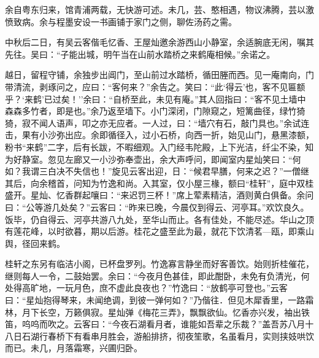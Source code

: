 \documentclass[]{article}
\begin{document}
余自粤东归来，馆青浦两载，无快游可述。未几，芸、憨相遇，物议沸腾，芸以激愤致病。余与程墨安设一书画铺于家门之侧，聊佐汤药之需。

中秋后二日，有吴云客偕毛忆香、王屋灿邀余游西山小静室，余适腕底无闲，嘱其先往。吴曰：``子能出城，明午当在山前水踏桥之来鹤庵相候。''余诺之。

越日，留程守铺，余独步出阊门，至山前过水踏桥，循田塍而西。见一庵南向，门带清流，剥琢问之，应曰：``客何来？''余告之。笑曰：``此`得云'也，客不见匾额乎？`来鹤'已过矣！''余曰：``自桥至此，未见有庵。''其人回指曰：``客不见土墙中森森多竹者，即是也。''余乃返至墙下。小门深闭，门隙窥之，短篱曲径，绿竹猗猗，寂不闻人语声，叩之亦无应者。一人过，曰：``墙穴有石，敲门具也。''余试连击，果有小沙弥出应。余即循径入，过小石桥，向西一折，始见山门，悬黑漆额，粉书``来鹤''二字，后有长跋，不暇细观。入门经韦陀殿，上下光洁，纤尘不染，知为好静室。忽见左廊又一小沙弥奉壶出，余大声呼问，即闻室内星灿笑曰：``何如？我谓三白决不失信也！''旋见云客出迎，日：``候君早膳，何来之迟？''一僧继其后，向余稽首，问知为竹逸和尚。入其室，仅小屋三椽，额曰``桂轩''，庭中双桂盛开。星灿、忆香群起嚷曰：``来迟罚三杯！''席上荤素精洁，酒则黄白俱备。余问曰：``公等游几处矣？''云客曰：``昨来已晚，今晨仅到得云、河亭耳。''欢饮良久。饭毕，仍自得云、河亭共游八九处，至华山而止。各有佳处，不能尽述。华山之顶有莲花峰，以时欲暮，期以后游。桂花之盛至此为最，就花下饮清茗---瓯，即乘山舆，径回来鹤。

桂轩之东另有临洁小阁，已杯盘罗列。竹逸寡言静坐而好客善饮。始则折桂催花，继则每人一令，二鼓始罢。余曰：``今夜月色甚佳，即此酣卧，未免有负清光，何处得高旷地，一玩月色，庶不虚此良夜也？''竹逸曰：``放鹤亭可登也。''云客曰：``星灿抱得琴来，未闻绝调，到彼一弹何如？''乃偕往．但见木犀香里，一路霜林，月下长空，万籁俱寂。星灿弹《梅花三弄》，飘飘欲仙。忆香亦兴发，袖出铁笛，呜呜而吹之。云客曰：``今夜石湖看月者，谁能如吾辈之乐裁？''盖吾苏八月十八日石湖行春桥下有看串月胜会，游船排挤，彻夜笙歌，名虽看月，实则挟妓哄饮而已。未几，月落霜寒，兴圃归卧。
\end{document}
